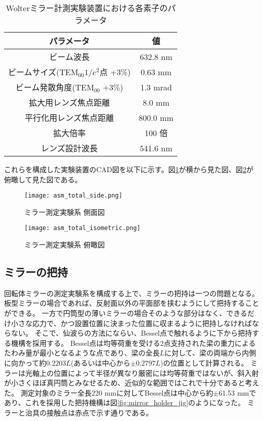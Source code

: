 \begin{table}[h]
\begin{center}
  \caption{Wolterミラー計測実験装置における各素子のパラメータ}
  \begin{tabular}{|c|c|} \hline
    パラメータ & 値 \\ \hline
    ビーム波長 & 632.8 nm  \\
    ビームサイズ($\text{TEM}_{00} 1/e^2$点 +3\%) & 0.63 mm  \\
    ビーム発散角度($\text{TEM}_{00}$ +3\%) & 1.3 mrad  \\
    拡大用レンズ焦点距離 & 8.0 mm  \\
    平行化用レンズ焦点距離 & 800.0 mm  \\
    拡大倍率 & 100 倍 \\
    レンズ設計波長 & 541.6 nm \\ \hline
  \end{tabular}
  \label{tb:mirror_experiment_params}
\end{center}
\end{table}

これらを構成した実験装置のCAD図を以下に示す。図\ref{fig:mirror_experiment_asm_cad_side}が横から見た図、図\ref{fig:mirror_experiment_asm_cad_isometric}が俯瞰して見た図である。

\begin{figure}[!ht]
\centering
\texttt{[image: asm\_total\_side.png]}
\caption{ミラー測定実験系 側面図}
\label{fig:mirror_experiment_asm_cad_side}
\end{figure}

\begin{figure}[!ht]
\centering
\texttt{[image: asm\_total\_isometric.png]}
\caption{ミラー測定実験系 俯瞰図}
\label{fig:mirror_experiment_asm_cad_isometric}
\end{figure}


\subsection{ミラーの把持}
回転体ミラーの測定実験系を構成する上で、ミラーの把持は一つの問題となる。
板型ミラーの場合であれば、反射面以外の平面部を挟むようにして把持することができる。
一方で円筒型の薄いミラーの場合そのような部分はなく、できるだけ小さな応力で、かつ設置位置に決まった位置に収まるように把持しなければならない。
そこで、仙波らの方法にならい、Bessel点で触れるように下から把持する機構を採用する。\cite{Senba2010}
Bessel点は均等荷重を受ける2点支持された梁の重力によるたわみ量が最小となるような点であり、梁の全長$L$に対して、梁の両端から内側に向かって約$0.2203L$(あるいは中心から$\pm 0.2797 L$)の位置として計算される。
ミラーは光軸上の位置によって半径が異なり厳密には均等荷重ではないが、斜入射が小さくほぼ真円筒とみなせるため、近似的な範囲ではこれで十分であると考えた。
測定対象のミラー全長220 mmに対してBessel点は中心から約$\pm$61.53 mmであり、これを採用した把持機構は図\ref{fig:mirror_holder_jig}のようになった。
ミラーと治具の接触点は赤点で示す通りである。

